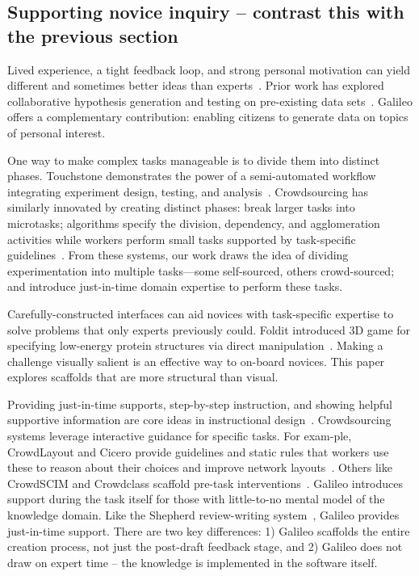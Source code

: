 \subsection{Supporting novice inquiry -- contrast this with the previous section}
Lived experience, a tight feedback loop, and strong personal motivation can yield different and sometimes better ideas than experts~\cite{VonHippel2005}. Prior work has explored collaborative hypothesis generation and testing on pre-existing data sets~\cite{luther2009pathfinder,willett2011commentspace}. Galileo offers a complementary contribution: enabling citizens to generate data on topics of personal interest.

One way to make complex tasks manageable is to divide them into distinct phases. Touchstone demonstrates the power of a semi-automated workflow integrating experiment design, testing, and analysis~\cite{Mackay2007}. Crowdsourcing has similarly innovated by creating distinct phases: break larger tasks into microtasks; algorithms specify the division, dependency, and agglomeration activities while workers perform small tasks supported by task-specific guidelines~\cite{lasecki2012real}. From these systems, our work draws the idea of dividing experimentation into multiple tasks—some self-sourced, others crowd-sourced; and introduce just-in-time domain expertise to perform these tasks. 

Carefully-constructed interfaces can aid novices with task-specific expertise to solve problems that only experts previously could. Foldit introduced 3D game for specifying low-energy protein structures via direct manipulation~\cite{Cooper2010}. Making a challenge visually salient is an effective way to on-board novices. This paper explores scaffolds that are more structural than visual.

Providing just-in-time supports, step-by-step instruction, and showing helpful supportive information are core ideas in instructional design~\cite{Kirschner2008}. Crowdsourcing systems leverage interactive guidance for specific tasks. For exam-ple, CrowdLayout and Cicero provide guidelines and static rules that workers use these to reason about their choices and improve network layouts~\cite{chen2019cicero, Singh:2018:CCD:3173574.3173806}. Others like CrowdSCIM and Crowdclass scaffold pre-task interventions~\cite{Lee2016,wang2018exploring}. Galileo introduces support during the task itself for those with little-to-no mental model of the knowledge domain. Like the Shepherd review-writing system~\cite{dow2012shepherding}, Galileo provides just-in-time support. There are two key differences: 1) Galileo scaffolds the entire creation process, not just the post-draft feedback stage, and 2) Galileo does not draw on expert time – the knowledge is implemented in the software itself. 

